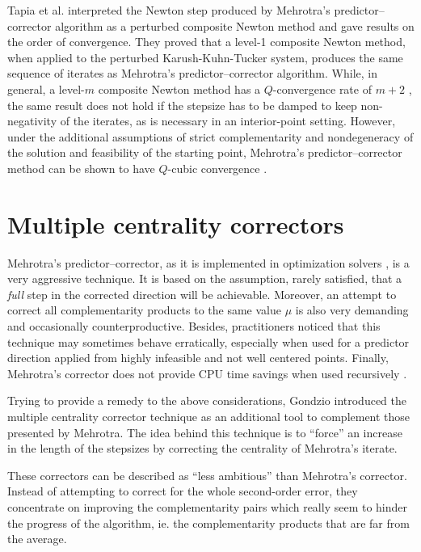 Tapia et al. \cite{TapiaZhangSaltzmanWeiser} interpreted the Newton step 
produced by Mehrotra's predictor--corrector algorithm as a perturbed
composite Newton method and gave results on the order of convergence. 
They proved that a level-1 composite Newton method, when applied 
to the perturbed Karush-Kuhn-Tucker system, produces the same 
sequence of iterates as Mehrotra's predictor--corrector algorithm. 
While, in general, a level-$m$ composite Newton method has 
a $Q$-convergence rate of $m+2$ \cite{OrtegaRheinboldt},
the same result does not hold 
if the stepsize has to be damped to keep non-negativity of the iterates, 
as is necessary in an interior-point setting. However, under 
the additional assumptions of strict complementarity and nondegeneracy 
of the solution and feasibility of the starting point, Mehrotra's 
predictor--corrector method can be shown to have $Q$-cubic convergence
\cite{TapiaZhangSaltzmanWeiser}.


%
%
\section{Multiple centrality correctors}
\label{sec:MultipleCC}

Mehrotra's predictor--corrector, as it is implemented in optimization 
solvers \cite{LustigMarstenShanno,Mehrotra92}, is a very aggressive 
technique. It is based on the assumption, rarely satisfied, that a 
{\it full} step in the corrected direction will be achievable.
Moreover, an attempt to correct all complementarity products to the 
same value $\mu$ is also very demanding and occasionally
counterproductive. 
Besides, practitioners noticed that this technique may sometimes 
behave erratically, especially when used for a predictor direction 
applied from highly infeasible and not well centered points. 
Finally, Mehrotra's corrector does not provide CPU time savings 
when used recursively \cite{CarpenterLustigMulveyShanno}.

Trying to provide a remedy to the above considerations, Gondzio 
\cite{Gondzio96} introduced the multiple centrality corrector technique 
as an additional tool to complement those presented by Mehrotra. 
The idea behind this technique is to ``force'' an increase in the 
length of the stepsizes by correcting the centrality of Mehrotra's 
iterate.

These correctors can be described as ``less ambitious'' than Mehrotra's
corrector. Instead of attempting to correct for the whole second-order error,
they concentrate on improving the complementarity pairs which really seem 
to hinder the progress of the algorithm, ie. the complementarity products 
that are far from the average.

